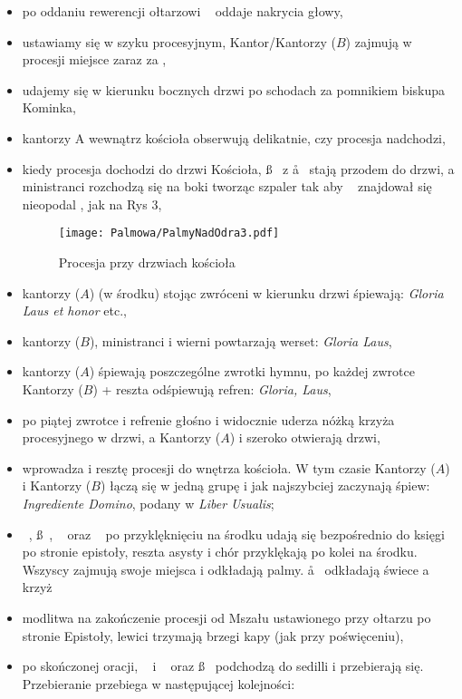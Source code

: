 \begin{itemize}
	\item po oddaniu rewerencji ołtarzowi \cc~ oddaje nakrycia głowy,
	\item ustawiamy się w szyku procesyjnym, Kantor/Kantorzy ($B$) zajmują w
	      procesji miejsce zaraz za ,
	\item udajemy się w kierunku bocznych drzwi po schodach za pomnikiem biskupa
	      Kominka,
	\item kantorzy A wewnątrz kościoła obserwują delikatnie, czy procesja
	      nadchodzi,
	\item kiedy procesja dochodzi do drzwi Kościoła, \ss~ z \aa~ stają przodem
	      do drzwi, a ministranci rozchodzą się na boki tworząc szpaler tak aby
	      \ii~ znajdował się nieopodal , jak na Rys 3,

	      \bigskip

	      \begin{figure}[h]
		      \centering
		      \texttt{[image: Palmowa/PalmyNadOdra3.pdf]}
		      \caption{Procesja przy drzwiach kościoła}
	      \end{figure}

	\item kantorzy ($A$) (w środku) stojąc zwróceni w kierunku drzwi śpiewają:
	      \textit{Gloria Laus et honor} etc.,
	\item kantorzy ($B$), ministranci i wierni powtarzają werset: \textit{Gloria
		      Laus},
	\item kantorzy ($A$) śpiewają poszczególne zwrotki hymnu, po każdej zwrotce
	      Kantorzy ($B$) + reszta odśpiewują refren: \textit{Gloria, Laus},
	\item po piątej zwrotce i refrenie  głośno i widocznie uderza nóżką
	      krzyża procesyjnego w drzwi, a Kantorzy ($A$) i  szeroko otwierają
	      drzwi,
	\item {} wprowadza  i resztę procesji do wnętrza kościoła. W tym
	      czasie Kantorzy ($A$) i Kantorzy ($B$) łączą się w jedną grupę i jak
	      najszybciej zaczynają śpiew: \textit{Ingrediente Domino}, podany w
	      \textit{Liber Usualis};
	\item \dd~, \ss~, \ii~ oraz \cc~ po przyklęknięciu na środku udają się
	      bezpośrednio do księgi po stronie epistoły, reszta asysty i chór
	      przyklękają po kolei na środku. Wszyscy zajmują swoje miejsca i
	      odkładają palmy. \aa~ odkładają świece a  krzyż
	\item modlitwa na zakończenie procesji od Mszału ustawionego przy ołtarzu po
	      stronie Epistoły, lewici trzymają brzegi kapy (jak przy poświęceniu),
	\item po skończonej oracji, \ii~ i \dd~ oraz \ss~ podchodzą do sedilli i
	      przebierają się. Przebieranie przebiega w następującej kolejności:


\end{itemize}
